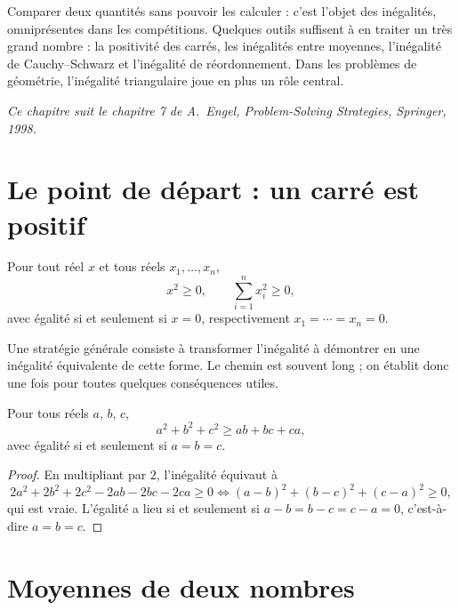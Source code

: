 \documentclass[11pt]{article}
\begin{document}
\setcounter{page}{60}


Comparer deux quantités sans pouvoir les calculer : c'est l'objet des
inégalités, omniprésentes dans les compétitions. Quelques outils suffisent
à en traiter un très grand nombre : la positivité des carrés, les
inégalités entre moyennes, l'inégalité de Cauchy--Schwarz et l'inégalité
de réordonnement. Dans les problèmes de géométrie, l'inégalité triangulaire
joue en plus un rôle central.

\medskip
{\small\itshape Ce chapitre suit le chapitre 7 de A.~Engel,
\emph{Problem-Solving Strategies}, Springer, 1998.}

\section{Le point de départ : un carré est positif}\label{sec:point-de-depart}

Pour tout réel $x$ et tous réels $x_1, \ldots, x_n$,
\[
x^2 \geqslant 0, \qquad \sum_{i=1}^{n} x_i^2 \geqslant 0,
\]
avec égalité si et seulement si $x = 0$, respectivement
$x_1 = \cdots = x_n = 0$.

Une stratégie générale consiste à transformer l'inégalité à démontrer en
une inégalité équivalente de cette forme. Le chemin est souvent long ; on
établit donc une fois pour toutes quelques conséquences utiles.

\begin{exemple}\label{exm:E5}
Pour tous réels $a$, $b$, $c$,
\[
a^2 + b^2 + c^2 \geqslant ab + bc + ca,
\]
avec égalité si et seulement si $a = b = c$.
\end{exemple}

\begin{proof}
En multipliant par $2$, l'inégalité équivaut à
\[
2a^2 + 2b^2 + 2c^2 - 2ab - 2bc - 2ca \geqslant 0
\iff (a-b)^2 + (b-c)^2 + (c-a)^2 \geqslant 0,
\]
qui est vraie. L'égalité a lieu si et seulement si $a - b = b - c = c - a = 0$, c'est-à-dire
$a = b = c$.
\end{proof}

\section{Moyennes de deux nombres}\label{sec:moyennes-deux-nombres}
\end{document}
